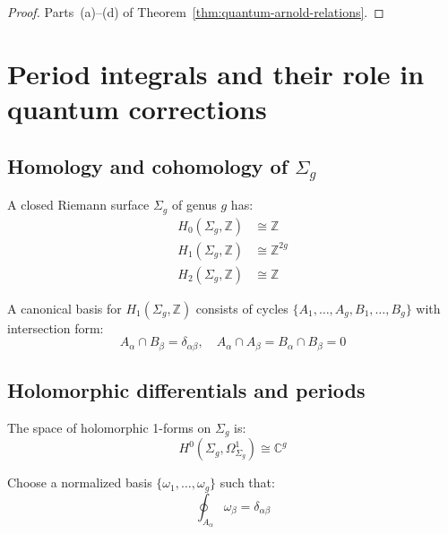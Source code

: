 \begin{proof}
Parts~(a)--(d) of Theorem~\ref{thm:quantum-arnold-relations}.
\end{proof}


\section{Period integrals and their role in quantum corrections}
\label{sec:period-integrals-quantum}

\subsection{\texorpdfstring{Homology and cohomology of $\Sigma_g$}{Homology and cohomology of Sigma-g}}

\begin{theorem}
\label{thm:topology-genus-g}
A closed Riemann surface $\Sigma_g$ of genus $g$ has:
\begin{align}
H_0(\Sigma_g, \mathbb{Z}) &\cong \mathbb{Z}\\
H_1(\Sigma_g, \mathbb{Z}) &\cong \mathbb{Z}^{2g}\\
H_2(\Sigma_g, \mathbb{Z}) &\cong \mathbb{Z}
\end{align}

A canonical basis for $H_1(\Sigma_g, \mathbb{Z})$ consists of cycles $\{A_1, \ldots, A_g, B_1, \ldots, B_g\}$ with intersection form:
\begin{equation}
A_\alpha \cap B_\beta = \delta_{\alpha\beta}, \quad A_\alpha \cap A_\beta = B_\alpha \cap B_\beta = 0
\end{equation}
\end{theorem}

\subsection{Holomorphic differentials and periods}
\label{sec:holomorphic-forms-genus-g}

\begin{definition}
\label{def:holomorphic-differentials}
The space of holomorphic 1-forms on $\Sigma_g$ is:
\begin{equation}
H^0(\Sigma_g, \Omega^1_{\Sigma_g}) \cong \mathbb{C}^g
\end{equation}

Choose a normalized basis $\{\omega_1, \ldots, \omega_g\}$ such that:
\begin{equation}
\oint_{A_\alpha} \omega_\beta = \delta_{\alpha\beta}
\end{equation}
\end{definition}

